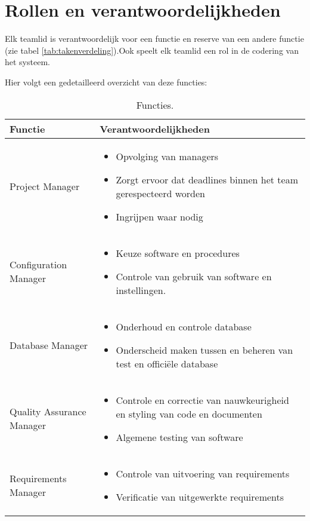 \section{Rollen en verantwoordelijkheden}
Elk teamlid is verantwoordelijk voor een functie en reserve van een andere functie (zie tabel \ref{tab:takenverdeling}).Ook speelt elk teamlid een rol in de codering van het systeem. 

Hier volgt een gedetailleerd overzicht van deze functies:
\begin{table} [H]
	\centering
	\caption{Functies.}
	\begin{tabular} {l | p{10cm}}
		Functie & Verantwoordelijkheden \\
		\hline
		Project Manager &  
		\begin{itemize}
		\item Opvolging van managers
		\item Zorgt ervoor dat deadlines binnen het team gerespecteerd worden
		\item Ingrijpen waar nodig
		\end{itemize}\\
		Configuration Manager &
		\begin{itemize}
		\item Keuze software en procedures
		\item Controle van gebruik van software en instellingen.
		\end{itemize}\\
		Database Manager &
		\begin{itemize}
		\item Onderhoud en controle database
		\item Onderscheid maken tussen en beheren van test en officiële database
		\end{itemize}\\
		Quality Assurance Manager &
		\begin{itemize}
		\item Controle en correctie van nauwkeurigheid en styling van code en documenten
		\item Algemene testing van software
		\end{itemize}\\
		Requirements Manager &
		\begin{itemize}
		\item Controle van uitvoering van requirements
		\item Verificatie van uitgewerkte requirements
		\end{itemize}\\

\end{tabular}
\end{table}
